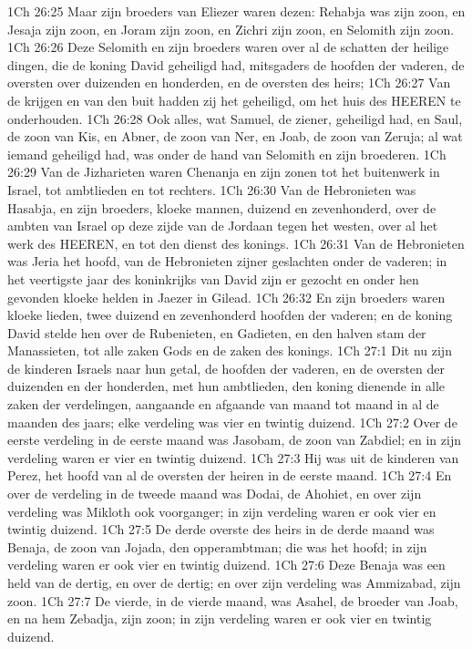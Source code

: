 1Ch 26:25  Maar zijn broeders van Eliezer waren dezen: Rehabja was zijn zoon, en Jesaja zijn zoon, en Joram zijn zoon, en Zichri zijn zoon, en Selomith zijn zoon.
1Ch 26:26  Deze Selomith en zijn broeders waren over al de schatten der heilige dingen, die de koning David geheiligd had, mitsgaders de hoofden der vaderen, de oversten over duizenden en honderden, en de oversten des heirs;
1Ch 26:27  Van de krijgen en van den buit hadden zij het geheiligd, om het huis des HEEREN te onderhouden.
1Ch 26:28  Ook alles, wat Samuel, de ziener, geheiligd had, en Saul, de zoon van Kis, en Abner, de zoon van Ner, en Joab, de zoon van Zeruja; al wat iemand geheiligd had, was onder de hand van Selomith en zijn broederen.
1Ch 26:29  Van de Jizharieten waren Chenanja en zijn zonen tot het buitenwerk in Israel, tot ambtlieden en tot rechters.
1Ch 26:30  Van de Hebronieten was Hasabja, en zijn broeders, kloeke mannen, duizend en zevenhonderd, over de ambten van Israel op deze zijde van de Jordaan tegen het westen, over al het werk des HEEREN, en tot den dienst des konings.
1Ch 26:31  Van de Hebronieten was Jeria het hoofd, van de Hebronieten zijner geslachten onder de vaderen; in het veertigste jaar des koninkrijks van David zijn er gezocht en onder hen gevonden kloeke helden in Jaezer in Gilead.
1Ch 26:32  En zijn broeders waren kloeke lieden, twee duizend en zevenhonderd hoofden der vaderen; en de koning David stelde hen over de Rubenieten, en Gadieten, en den halven stam der Manassieten, tot alle zaken Gods en de zaken des konings.
1Ch 27:1  Dit nu zijn de kinderen Israels naar hun getal, de hoofden der vaderen, en de oversten der duizenden en der honderden, met hun ambtlieden, den koning dienende in alle zaken der verdelingen, aangaande en afgaande van maand tot maand in al de maanden des jaars; elke verdeling was vier en twintig duizend.
1Ch 27:2  Over de eerste verdeling in de eerste maand was Jasobam, de zoon van Zabdiel; en in zijn verdeling waren er vier en twintig duizend.
1Ch 27:3  Hij was uit de kinderen van Perez, het hoofd van al de oversten der heiren in de eerste maand.
1Ch 27:4  En over de verdeling in de tweede maand was Dodai, de Ahohiet, en over zijn verdeling was Mikloth ook voorganger; in zijn verdeling waren er ook vier en twintig duizend.
1Ch 27:5  De derde overste des heirs in de derde maand was Benaja, de zoon van Jojada, den opperambtman; die was het hoofd; in zijn verdeling waren er ook vier en twintig duizend.
1Ch 27:6  Deze Benaja was een held van de dertig, en over de dertig; en over zijn verdeling was Ammizabad, zijn zoon.
1Ch 27:7  De vierde, in de vierde maand, was Asahel, de broeder van Joab, en na hem Zebadja, zijn zoon; in zijn verdeling waren er ook vier en twintig duizend.
